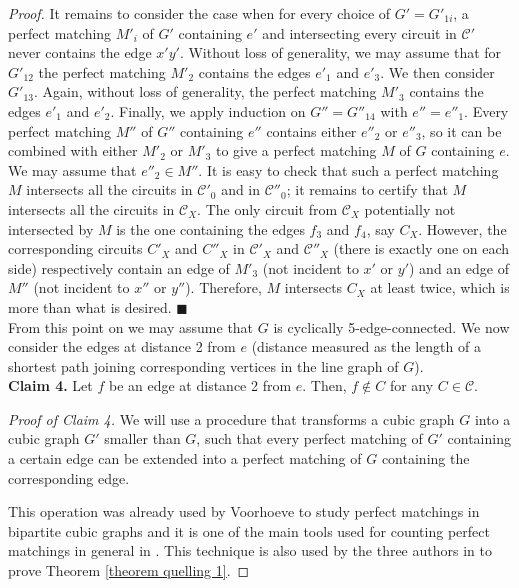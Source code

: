 \documentclass[]{theclass}
\begin{document}
\begin{proof}
It remains to consider the case when for every choice of $G'=G'_{1i}$, a perfect matching $M'_i$ of $G'$ containing $e'$ and intersecting every circuit in $\mathcal{C}'$ never contains the edge $x'y'$. 
 Without loss of generality, we may assume that for $G'_{12}$ the perfect matching $M'_2$ contains the edges $e'_1$ and $e'_3$. We then consider $G'_{13}$. Again, without loss of generality, the perfect matching $M'_3$ contains the edges $e'_1$ and $e'_2$. Finally, we apply induction on  $G''=G''_{14}$ with $e''=e''_1$. Every perfect matching $M''$ of $G''$ containing $e''$ contains either $e''_2$ or $e''_3$, so it can be combined with either $M'_2$ or $M'_3$ to give a perfect matching $M$ of $G$ containing $e$. We may assume that $e''_2\in M''$. 
 It is easy to check that such a perfect matching $M$ intersects all the circuits in $\mathcal{C}'_0$ and in $\mathcal{C}''_0$;  it remains to certify that $M$ intersects all the circuits in $\mathcal{C}_X$. The only circuit from $\mathcal{C}_X$ potentially not intersected by $M$ is the one containing the edges $f_3$ and $f_4$, say $C_X$. However, the corresponding circuits $C'_X$ and $C''_X$ in $\mathcal{C}'_X$ and $\mathcal{C}''_X$ (there is exactly one on each side) respectively contain an edge of $M'_3$ (not incident to $x'$ or $y'$) and an edge of $M''$ (not incident to $x''$ or $y''$). Therefore, $M$ intersects $C_X$ at least twice, which is more than what is desired. 
\hfill {\tiny$\blacksquare$}\\

From this point on we may assume that $G$ is cyclically 5-edge-connected. We now consider the edges at distance 2 from $e$ (distance measured as the length of a shortest path joining corresponding vertices in the line graph of $G$).\\

\noindent\textbf{Claim 4.} Let $f$ be an edge at distance 2 from $e$. Then, $f\notin C$ for any $C\in \mathcal{C}$. 

\noindent\emph{Proof of Claim 4.} 
We will use a procedure that transforms a cubic graph $G$ into a cubic graph $G'$ smaller than $G$, such that every perfect matching of $G'$ containing a certain edge can be extended into a perfect matching of $G$ containing the corresponding edge. 

This operation was already used by Voorhoeve \cite{voorhoeve} to study perfect matchings in bipartite cubic graphs and it is one of the main tools used for counting perfect matchings in general in \cite{EsperetLovaszPlummer}. This technique is also used by the three authors in \cite{quelling1} to prove Theorem \ref{theorem quelling 1}.


\end{proof}
\end{document}
